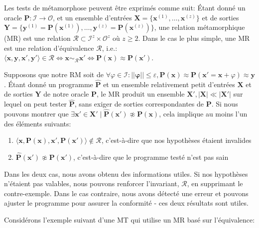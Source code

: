 Les tests de métamorphose peuvent être exprimés comme suit: Étant donné un oracle $\mathbf P: \mathcal I \rightarrow \mathcal O$, et un ensemble d'entrées $\mathbf X = \{\mathbf{x}^{(1)}, \dots, \mathbf{x}^{(z)}\}$ et de sorties $\mathbf Y = \{\mathbf{y}^{(1)} = \mathbf{P}(\mathbf{x}^{(1)}), \dots, \mathbf{y}^{(z)} = \mathbf{P}(\mathbf{x}^{(z)})\}$, une relation métamorphique (MR) est une relation $\mathcal R \subset \mathcal I^z \times \mathcal O^z$ où $z \geq 2$. Dans le cas le plus simple, une MR est une relation d'équivalence $\mathcal R$, i.e.: $\langle \mathbf x, \mathbf y, \mathbf x', \mathbf y' \rangle \in \mathcal R \Leftrightarrow \mathbf x \sim_{\mathcal R} \mathbf x' \Leftrightarrow \mathbf P(\mathbf x) \approx \mathbf P(\mathbf x')$.

Supposons que notre RM soit de $\forall \varphi \in \mathcal I: ||\mathbf\varphi|| \leq \varepsilon, \mathbf P(\mathbf x) \approx \mathbf P(\mathbf x' = \mathbf x + \varphi) \approx \mathbf y$. Étant donné un programme $\mathbf{\hat P}$ et un ensemble relativement petit d'entrées $\mathbf X$ et de sorties $\mathbf Y$ de notre oracle $\mathbf P$, le MR produit un ensemble $\mathbf X', |\mathbf X| \ll |\mathbf X'|$ sur lequel on peut tester $\mathbf{\hat P}$, sans exiger de sorties correspondantes de $\mathbf P$. Si nous pouvons montrer que $\exists \mathbf x' \in \mathbf X' \mid \mathbf{\hat P}(\mathbf x') \not\approx \mathbf P(\mathbf x)$, cela implique au moins l'un des éléments suivants:

\begin{enumerate}
\item $\langle \mathbf x, \mathbf P(\mathbf x), \mathbf x', \mathbf P(\mathbf x')\rangle \notin \mathcal R$, c'est-à-dire que nos hypothèses étaient invalides
\item $\mathbf{\hat P}(\mathbf x') \not\approx \mathbf{P}(\mathbf x')$, c'est-à-dire que le programme testé n'est pas sain
\end{enumerate}
%
Dans les deux cas, nous avons obtenu des informations utiles. Si nos hypothèses n'étaient pas valables, nous pouvons renforcer l'invariant, $\mathcal R$, en supprimant le contre-exemple. Dans le cas contraire, nous avons détecté une erreur et pouvons ajuster le programme pour assurer la conformité - ces deux résultats sont utiles.

Considérons l'exemple suivant d'une MT qui utilise un MR basé sur l'équivalence:

